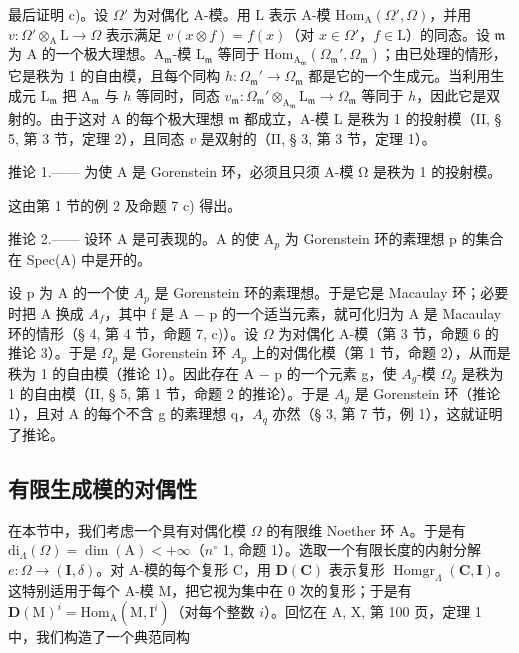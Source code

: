 最后证明 c)。设 \(\Omega'\) 为对偶化 A-模。用 L 表示 A-模 \(\mathrm{Hom}_{\mathrm{A}}(\Omega',\Omega)\)，并用 \(v:\Omega' \otimes_{\mathrm{A}} \mathrm{L} \longrightarrow \Omega\) 表示满足 \(v(x \otimes f) = f(x)\)（对 \(x \in \Omega'\)，\(f \in \mathrm{L}\)）的同态。设 \(\mathfrak{m}\) 为 A 的一个极大理想。\(\mathrm{A}_{\mathfrak{m}}\)-模 \(\mathrm{L}_{\mathfrak{m}}\) 等同于 \(\mathrm{Hom}_{\mathrm{A}_{\mathfrak{m}}}(\Omega_{\mathfrak{m}}',\Omega_{\mathfrak{m}})\)；由已处理的情形，它是秩为 1 的自由模，且每个同构 \(h:\Omega_{\mathfrak{m}}' \to \Omega_{\mathfrak{m}}\) 都是它的一个生成元。当利用生成元 \(\mathrm{L}_{\mathfrak{m}}\) 把 \(\mathrm{A}_{\mathfrak{m}}\) 与 \(h\) 等同时，同态 \(v_{\mathfrak{m}}:\Omega_{\mathfrak{m}}' \otimes_{\mathrm{A}_{\mathfrak{m}}}\mathrm{L}_{\mathfrak{m}} \longrightarrow \Omega_{\mathfrak{m}}\) 等同于 \(h\)，因此它是双射的。由于这对 A 的每个极大理想 \(\mathfrak{m}\) 都成立，A-模 L 是秩为 1 的投射模（II, § 5, 第 3 节，定理 2），且同态 \(v\) 是双射的（II, § 3, 第 3 节，定理 1）。

推论 1.—— 为使 A 是 Gorenstein 环，必须且只须 A-模 Ω 是秩为 1 的投射模。

这由第 1 节的例 2 及命题 7 c) 得出。

推论 2.—— 设环 A 是可表现的。A 的使 A\(_{p}\) 为 Gorenstein 环的素理想 p 的集合在 Spec(A) 中是开的。

设 p 为 A 的一个使 \(A_{p}\) 是 Gorenstein 环的素理想。于是它是 Macaulay 环；必要时把 A 换成 \(A_{f}\)，其中 f 是 A − p 的一个适当元素，就可化归为 A 是 Macaulay 环的情形（§ 4, 第 4 节，命题 7, c)）。设 \(\Omega\) 为对偶化 A-模（第 3 节，命题 6 的推论 3）。于是 \(\Omega_{p}\) 是 Gorenstein 环 \(A_{p}\) 上的对偶化模（第 1 节，命题 2），从而是秩为 1 的自由模（推论 1）。因此存在 A − p 的一个元素 g，使 \(A_{g}\)-模 \(\Omega_{g}\) 是秩为 1 的自由模（II, § 5, 第 1 节，命题 2 的推论）。于是 \(A_{g}\) 是 Gorenstein 环（推论 1），且对 A 的每个不含 g 的素理想 q，\(A_{q}\) 亦然（§ 3, 第 7 节，例 1），这就证明了推论。

\subsection{有限生成模的对偶性}

在本节中，我们考虑一个具有对偶化模 \(\Omega\) 的有限维 Noether 环 A。于是有 \(\mathrm{di}_{\Lambda}(\Omega) = \dim(\mathrm{A}) < +\infty\)（\(n^{\circ}\) 1, 命题 1）。选取一个有限长度的内射分解 \(e: \Omega \to (\mathbf{I}, \delta)\)。对 A-模的每个复形 C，用 \(\mathbf{D}(\mathbf{C})\) 表示复形 \(\operatorname{Homgr}_{\Lambda}(\mathbf{C}, \mathbf{I})\)。这特别适用于每个 A-模 M，把它视为集中在 0 次的复形；于是有 \(\mathbf{D}(\mathrm{M})^{i} = \mathrm{Hom}_{\mathrm{A}}(\mathrm{M},\mathrm{I}^{i})\)（对每个整数 \(i\)）。回忆在 A, X, 第 100 页，定理 1 中，我们构造了一个典范同构

